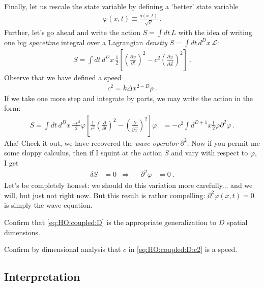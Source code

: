 Finally, let us rescale the state variable by defining a `better' state variable
\begin{align}
	\varphi(x,t) \equiv \frac{q(x,t)}{\sqrt{\rho}} \ .
\end{align}
Further, let's go ahead and write the action $S=\int dt \, L$ with the idea of writing one big \emph{spacetime} integral over a Lagrangian \emph{denstiy} $S = \int dt\, d^Dx \, \mathcal L$:
\begin{align}
	S = \int dt \, d^Dx \,
	\frac{1}{2}
	\left[
	\left( 
		\frac{\partial \varphi}{\partial t}
		\right)^2
	- 
	c^2
	\left(\frac{\partial \varphi}{\partial \vec{x} }\right)^2
	\right] \ .
\end{align}
Observe that we have defined a speed
\begin{align}
	c^2 = k \Delta x^{2-D} \rho \ .
	\label{eq:HO:coupled:D:c2}
\end{align}
If we take one more step and integrate by parts, we may write the action in the form:
\begin{align}
	S = \int dt \, d^Dx \,
	\frac{-c^2}{2}
	\varphi
	\left[
	\frac{1}{c^2}
	\left( 
		\frac{\partial}{\partial t}
		\right)^2
	- 
	\left(\frac{\partial }{\partial \vec{x} }\right)^2
	\right]
	\varphi 
	&=
	-c^2 \int d^{D+1}x \frac{1}{2} \varphi \partial^2 \varphi 
	\ .
\end{align}
Aha! Check it out, we have recovered the \emph{wave operator} $\partial^2$.  Now if you permit me some sloppy calculus, then if I squint at the action $S$ and vary with respect to $\varphi$, I get 
\begin{align}
	\delta S &=0 
	&\Rightarrow&&
	\partial^2 \varphi &= 0 \ .
\end{align}
Let's be completely honest: we should do this variation more carefully... and we will, but just not right now. But this result is rather compelling: $\partial^2\varphi(x,t) = 0$ is simply the wave equation.
\begin{exercise}
Confirm that \eqref{eq:HO:coupled:D} is the appropriate generalization to $D$ spatial dimensions.
\end{exercise}
\begin{exercise}
Confirm by dimensional analysis that $c$ in \eqref{eq:HO:coupled:D:c2} is a speed.
\end{exercise}

\subsection{Interpretation}

